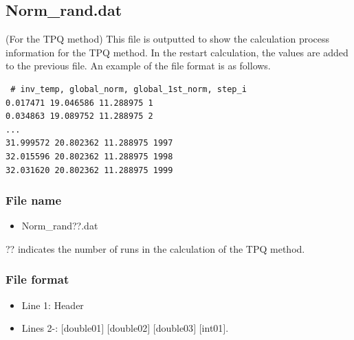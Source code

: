 \newpage
\subsection{Norm\_rand.dat}
\label{Subsec:normrand}
(For the TPQ method) This file is outputted to show the calculation process information for the TPQ method.
In the restart calculation, the values are added to the previous file.
An example of the file format is as follows.\\
\begin{minipage}{12.5cm}
\begin{screen}
\begin{verbatim}
 # inv_temp, global_norm, global_1st_norm, step_i 
0.017471 19.046586 11.288975 1
0.034863 19.089752 11.288975 2
...
31.999572 20.802362 11.288975 1997
32.015596 20.802362 11.288975 1998
32.031620 20.802362 11.288975 1999
\end{verbatim}
\end{screen}
\end{minipage}

\subsubsection{File name}
 \begin{itemize}
   \item Norm\_rand??.dat
  \end{itemize}
  ?? indicates the number of runs in the calculation of the TPQ method.

\subsubsection{File format}
 \begin{itemize}
   \item Line 1: Header
   \item Lines 2-: $[$double01$]$ $[$double02$]$ $[$double03$]$ $[$int01$]$.
  \end{itemize}
  
